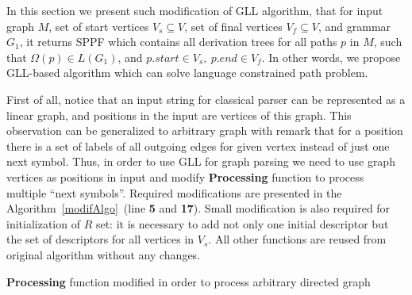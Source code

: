 In this section we present such modification of GLL algorithm, that for input graph $M$, set of start vertices $V_s\subseteq V$, set of final vertices $V_f\subseteq V$, and grammar $G_1$, it returns SPPF which contains all derivation trees for all paths $p$ in $M$, such that $\Omega(p) \in L(G_1)$, and $p.start \in V_s,\ p.end \in V_f$.
In other words, we propose GLL-based algorithm which can solve language constrained path problem.

First of all, notice that an input string for classical parser can be represented as a linear graph, and positions in the input are vertices of this graph.
This observation can be generalized to arbitrary graph with remark that for a position there is a set of labels of all outgoing edges for given vertex instead of just one next symbol. 
Thus, in order to use GLL for graph parsing we need to use graph vertices as positions in input and modify \textbf{Processing} function to process multiple ``next symbols''.
Required modifications are presented in the Algorithm~\ref{modifAlgo}~(line \textbf{5} and \textbf{17}).
Small modification is also required for initialization of $R$ set: it is necessary to add not only one initial descriptor but the set of descriptors for all vertices in $V_s$.
All other functions are reused from original algorithm without any changes.

\begin{algorithm}[h]
\begin{algorithmic}[1]
\caption{\textbf{Processing} function modified in order to process arbitrary directed graph}
\label{modifAlgo}
       \boldnext
       \Else 
       \EndIf
       \EndIf
       \EndFor
  \EndCase
	   \boldnext
       \EndFor
  \EndCase
  \EndCase
  \Case{$\_$}
  \EndCase
  \EndSwitch
\EndFunction

\end{algorithmic}
\end{algorithm}

